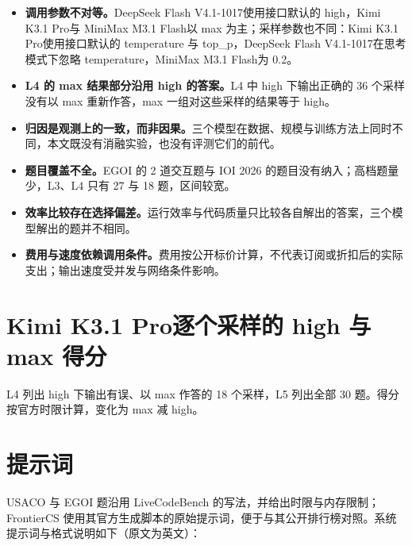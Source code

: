 \documentclass[11pt,a4paper,fontset=none]{ctexart}
\newcommand{\kimi}{Kimi K3.1 Pro}
\newcommand{\mini}{MiniMax M3.1 Flash}
\newcommand{\ds}{DeepSeek Flash V4.1-1017}
\newcommand{\lead}[1]{\textbf{#1}\quad}
\begin{document}
\begin{itemize}[leftmargin=1.6em]
  \item \lead{调用参数不对等。}\ds 使用接口默认的 high，\kimi 与 \mini 以 max 为主；采样参数也不同：\kimi 使用接口默认的 temperature 与 top\_p，\ds 在思考模式下忽略 temperature，\mini 为 0.2。
  \item \lead{L4 的 max 结果部分沿用 high 的答案。}L4 中 high 下输出正确的 36 个采样没有以 max 重新作答，max 一组对这些采样的结果等于 high。
  \item \lead{归因是观测上的一致，而非因果。}三个模型在数据、规模与训练方法上同时不同，本文既没有消融实验，也没有评测它们的前代。
  \item \lead{题目覆盖不全。}EGOI 的 2 道交互题与 IOI 2026 的题目没有纳入；高档题量少，L3、L4 只有 27 与 18 题，区间较宽。
  \item \lead{效率比较存在选择偏差。}运行效率与代码质量只比较各自解出的答案，三个模型解出的题并不相同。
  \item \lead{费用与速度依赖调用条件。}费用按公开标价计算，不代表订阅或折扣后的实际支出；输出速度受并发与网络条件影响。
\end{itemize}




\appendix
\section{\kimi 逐个采样的 high 与 max 得分}
\label{app:effort}

L4 列出 high 下输出有误、以 max 作答的 18 个采样，L5 列出全部 30 题。得分按官方时限计算，变化为 max 减 high。

{\small}

\section{提示词}
\label{app:prompts}

USACO 与 EGOI 题沿用 LiveCodeBench 的写法，并给出时限与内存限制；FrontierCS 使用其官方生成脚本的原始提示词，便于与其公开排行榜对照。系统提示词与格式说明如下（原文为英文）：
\end{document}
